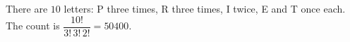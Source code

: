 There are $10$ letters: P three times, R three times, I twice, E and T once each. The count is $\dfrac{10!}{3!\,3!\,2!}=\boxed{50400}$.
